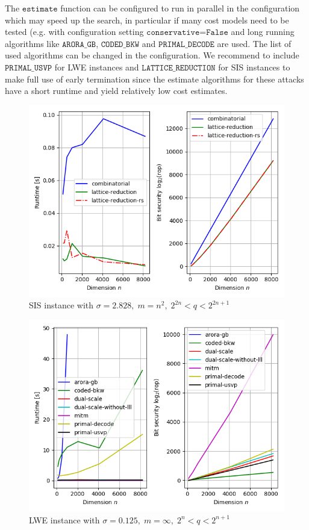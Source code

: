 The $\texttt{estimate}$ function can be configured to run in parallel in the configuration which may speed up the search, in particular if many cost models need to be tested (e.g. with configuration setting $\texttt{conservative=False}$ and long running algorithms like $\texttt{ARORA\_GB}$, $\texttt{CODED\_BKW}$ and $\texttt{PRIMAL\_DECODE}$ are used. The list of used algorithms can be changed in the configuration. We recommend to include $\texttt{PRIMAL\_USVP}$ for LWE instances and $\texttt{LATTICE\_REDUCTION}$ for SIS instances to make full use of early termination since the estimate algorithms for these attacks have a short runtime and yield relatively low cost estimates.

\begin{figure}[h]
    \centering
    \includegraphics[width=1\textwidth]{graphics/SIS_stddev=2,828_plots_1s.png}
    \caption{SIS instance with $\sigma=2.828,\; m=n^2, \; 2^{2n} < q < 2^{2n+1}$}\label{fig:SIS-algs}
\end{figure}

\begin{figure}[h]
    \centering
    \includegraphics[width=1\textwidth]{graphics/LWE_stddev=0,125_plots_200s.png}
    \caption{LWE instance with $\sigma=0.125,\; m=\infty, \; 2^{n} < q < 2^{n+1}$}\label{fig:LWE-algs-small}
\end{figure}

